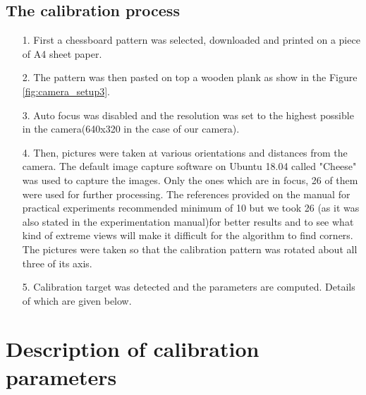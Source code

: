     \subsection{The calibration process}
    \begin{itemize}
        \item[1.] First a chessboard pattern was selected, downloaded and printed on a piece of A4 sheet paper. 
        \item[2.] The pattern was then pasted on top a wooden plank as show in the Figure \ref{fig:camera_setup3}. 
        \item[3.] Auto focus was disabled and the resolution was set to the highest possible in the camera(640x320 in the case of our camera).
        \item[4.] Then, pictures were taken at various orientations and distances from the camera. The default image capture software on Ubuntu 18.04 called "Cheese"  was used to capture the images. Only the ones which are in focus, 26 of them were used for further processing. The references provided on the manual for practical experiments recommended minimum of 10 but we took 26 (as it was also stated in the experimentation manual)for better results and to see what kind of extreme views will make it difficult for the algorithm to find corners. The pictures were taken so that the calibration pattern was rotated about all three of its axis.
        \item[5.] Calibration target was detected and the parameters are computed. Details of which are given below.
    \end{itemize}
    
    \section{Description of calibration parameters}
    
